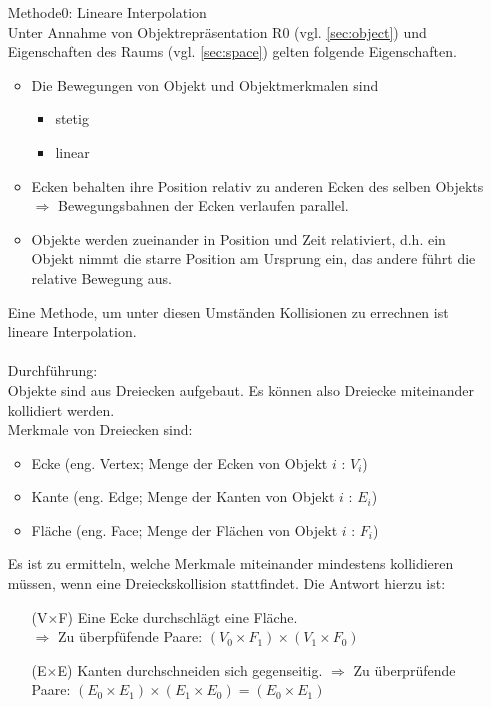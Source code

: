 \begin{itemize}
	\item[Methode0:] Lineare Interpolation\\
		Unter Annahme von Objektrepräsentation R0 (vgl. \ref{sec:object}) und Eigenschaften des Raums (vgl. \ref{sec:space}) gelten folgende Eigenschaften.
		\begin{itemize}
			\item Die Bewegungen von Objekt und Objektmerkmalen sind
				\begin{itemize}
					\item stetig
					\item linear
				\end{itemize}
			\item Ecken behalten ihre Position relativ zu anderen Ecken des selben Objekts $\Rightarrow$ Bewegungsbahnen der Ecken verlaufen parallel.
			\item Objekte werden zueinander in Position und Zeit relativiert, d.h. ein Objekt nimmt die starre Position am Ursprung ein, das andere führt die relative Bewegung aus.
		\end{itemize}
		Eine Methode, um unter diesen Umständen Kollisionen zu errechnen ist lineare Interpolation.\\
\\
		Durchführung:\\
		Objekte sind aus Dreiecken aufgebaut. Es können also Dreiecke miteinander kollidiert werden.\\
		Merkmale von Dreiecken sind:
		\begin{itemize}
			\item Ecke (eng. Vertex; Menge der Ecken von Objekt $i$ : $V_i$)
			\item Kante (eng. Edge; Menge der Kanten von Objekt $i$ : $E_i$)
			\item Fläche (eng. Face; Menge der Flächen von Objekt $i$ : $F_i$)
		\end{itemize}
		Es ist zu ermitteln, welche Merkmale miteinander mindestens kollidieren müssen, wenn eine Dreieckskollision stattfindet. Die Antwort hierzu ist:
		\begin{itemize}
			\item [(V$\times$F)] Eine Ecke durchschlägt eine Fläche.\\
				$\Rightarrow$ Zu überpfüfende Paare: $(V_0\times F_1)\times (V_1\times F_0)$
			\item [(E$\times$E)] Kanten durchschneiden sich gegenseitig.
				$\Rightarrow$ Zu überprüfende Paare: $(E_0\times E_1)\times (E_1\times E_0) = (E_0\times E_1)$

\end{itemize}
\end{itemize}
